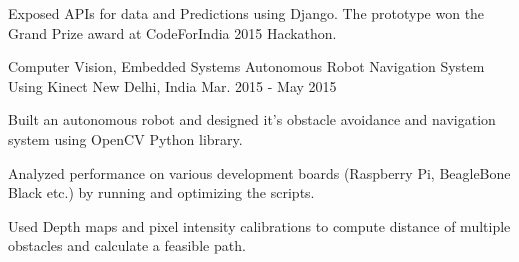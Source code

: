 \begin{cventries}
{\begin{cvitems}
        \item {Exposed APIs for data and Predictions using Django. The prototype won the Grand Prize award at CodeForIndia 2015 Hackathon.}
      \end{cvitems} 
    }
  \cventry
    {Computer Vision, Embedded Systems}
    {Autonomous Robot Navigation System Using Kinect}
    {New Delhi, India}
    {Mar. 2015 - May 2015}
    {
      \begin{cvitems}
        \item {Built an autonomous robot and designed it’s obstacle avoidance and navigation system using OpenCV Python library.}
        \item {Analyzed performance on various development boards (Raspberry Pi, BeagleBone Black etc.) by running and optimizing the scripts.}
        \item {Used Depth maps and pixel intensity calibrations to compute distance of multiple obstacles and calculate a feasible path.}
      \end{cvitems} 
    }
\end{cventries}
